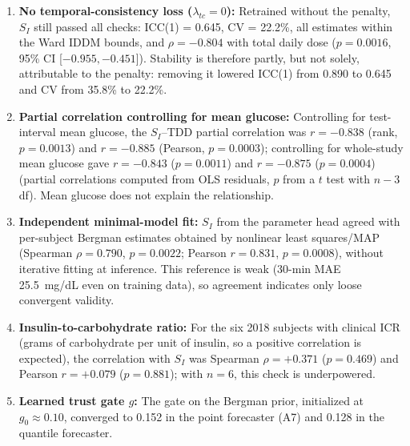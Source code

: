 \documentclass[journal]{IEEEtran}
\begin{document}
\begin{enumerate}
    \item \textbf{No temporal-consistency loss ($\lambda_{tc} = 0$):} Retrained without the penalty, $S_I$ still passed all checks: ICC(1) = 0.645, CV = 22.2\%, all estimates within the Ward IDDM bounds, and $\rho = -0.804$ with total daily dose ($p = 0.0016$, 95\% CI [$-0.955, -0.451$]). Stability is therefore partly, but not solely, attributable to the penalty: removing it lowered ICC(1) from 0.890 to 0.645 and CV from 35.8\% to 22.2\%.
    \item \textbf{Partial correlation controlling for mean glucose:} Controlling for test-interval mean glucose, the $S_I$--TDD partial correlation was $r = -0.838$ (rank, $p = 0.0013$) and $r = -0.885$ (Pearson, $p = 0.0003$); controlling for whole-study mean glucose gave $r = -0.843$ ($p = 0.0011$) and $r = -0.875$ ($p = 0.0004$) (partial correlations computed from OLS residuals, $p$ from a $t$ test with $n-3$ df). Mean glucose does not explain the relationship.
    \item \textbf{Independent minimal-model fit:} $S_I$ from the parameter head agreed with per-subject Bergman estimates obtained by nonlinear least squares/MAP (Spearman $\rho = 0.790$, $p = 0.0022$; Pearson $r = 0.831$, $p = 0.0008$), without iterative fitting at inference. This reference is weak (30-min MAE 25.5~mg/dL even on training data), so agreement indicates only loose convergent validity.
    \item \textbf{Insulin-to-carbohydrate ratio:} For the six 2018 subjects with clinical ICR (grams of carbohydrate per unit of insulin, so a positive correlation is expected), the correlation with $S_I$ was Spearman $\rho = +0.371$ ($p = 0.469$) and Pearson $r = +0.079$ ($p = 0.881$); with $n = 6$, this check is underpowered.
    \item \textbf{Learned trust gate $g$:} The gate on the Bergman prior, initialized at $g_0 \approx 0.10$, converged to 0.152 in the point forecaster (A7) and 0.128 in the quantile forecaster.
\end{enumerate}
\end{document}
